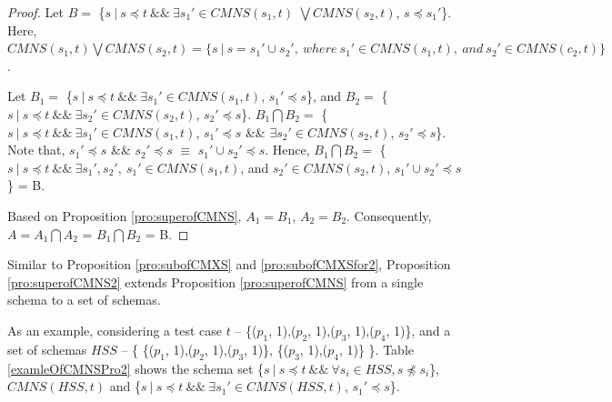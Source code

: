 {\begin{proof}
Let $B = $ \{$ s\ |\ s \preceq t \ \&\&\  \exists s_{1}' \in CMNS(s_{1}, t)$ $ \bigvee CMNS(s_{2}, t)$, $s \preceq s_{1}'$\}. Here,    $ CMNS(s_{1}, t) \bigvee CMNS(s_{2}, t) = \{ s\ |\ s = s_{1}' \cup s_{2}',\ where\ s_{1}' \in CMNS(s_{1}, t),\ and\ s_{2}' \in CMNS(c_{2}, t) \}$.

Let $B_{1} = $ \{$ s\ |\ s \preceq t \ \&\&\  \exists s_{1}' \in CMNS(s_{1}, t)$, $s_{1}' \preceq s$\}, and $B_{2} = $ \{$ s\ |\ s \preceq t \ \&\&\  \exists s_{2}' \in CMNS(s_{2}, t)$, $s_{2}' \preceq s$\}. $B_{1} \bigcap B_{2} = $ \{$ s\ |\ s \preceq t \ \&\&\  \exists s_{1}' \in CMNS(s_{1}, t)$, $s_{1}' \preceq s$ \&\& $\exists s_{2}' \in CMNS(s_{2}, t)$, $s_{2}' \preceq s$\}. Note that, $s_{1}' \preceq s $ \&\& $s_{2}' \preceq s$ $\equiv$ $s_{1}' \cup s_{2}' \preceq s$. Hence, $B_{1} \bigcap B_{2} = $ \{$ s\ |\ s \preceq t \ \&\&\  \exists s_{1}', s_{2}',\  s_{1}' \in CMNS(s_{1}, t)$, and $s_{2}' \in CMNS(s_{2}, t)$, $ s_{1}' \cup s_{2}' \preceq s$ \} = B.

Based on Proposition \ref{pro:superofCMNS}, $A_{1} = B_{1}$, $A_{2} = B_{2}$. Consequently,
$A = A_{1} \bigcap A_{2}$ = $B_{1} \bigcap B_{2}$  = B.


\end{proof}

Similar to Proposition \ref{pro:subofCMXS} and \ref{pro:subofCMXSfor2},  Proposition \ref{pro:superofCMNS2} extends Proposition \ref{pro:superofCMNS} from a single  schema to a set of schemas.

As an example, considering a test case $t$ -- \{($p_{1}$, 1),($p_{2}$, 1),($p_{3}$, 1),($p_{4}$, 1)\}, and a set of schemas  $HSS$ -- \{ \{($p_{1}$, 1),($p_{2}$, 1),($p_{3}$, 1)\},  \{($p_{3}$, 1),($p_{4}$, 1)\} \}. Table \ref{examleOfCMNSPro2} shows the schema set \{$s\ |\ s \preceq t\ \&\&\ \forall s_{i} \in HSS, s \npreceq s_{i} $\}, $CMNS(HSS, t)$ and \{$ s\ |\ s \preceq t \ \&\& \ \exists s_{1}' \in CMNS(HSS, t)$, $s_{1}' \preceq s$\}.


}
